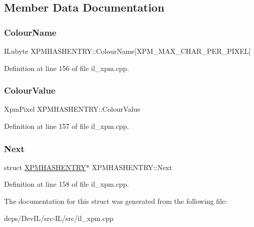 \subsection{Member Data Documentation}
\mbox{\label{structXPMHASHENTRY_a8a0e96a574a0b292cd5dfeefffe5e3a2}} 
\subsubsection{\texorpdfstring{Colour\+Name}{ColourName}}
{\footnotesize\ttfamily I\+Lubyte X\+P\+M\+H\+A\+S\+H\+E\+N\+T\+R\+Y\+::\+Colour\+Name\mbox{[}X\+P\+M\+\_\+\+M\+A\+X\+\_\+\+C\+H\+A\+R\+\_\+\+P\+E\+R\+\_\+\+P\+I\+X\+EL\mbox{]}}



Definition at line 156 of file il\+\_\+xpm.\+cpp.

\mbox{\label{structXPMHASHENTRY_a4dcb5591fd4048d549ead4dd0114590f}} 
\subsubsection{\texorpdfstring{Colour\+Value}{ColourValue}}
{\footnotesize\ttfamily Xpm\+Pixel X\+P\+M\+H\+A\+S\+H\+E\+N\+T\+R\+Y\+::\+Colour\+Value}



Definition at line 157 of file il\+\_\+xpm.\+cpp.

\mbox{\label{structXPMHASHENTRY_a165c0c800b7985e6427a119ac859ec8a}} 
\subsubsection{\texorpdfstring{Next}{Next}}
{\footnotesize\ttfamily struct \hyperlink{structXPMHASHENTRY}{X\+P\+M\+H\+A\+S\+H\+E\+N\+T\+RY}$\ast$ X\+P\+M\+H\+A\+S\+H\+E\+N\+T\+R\+Y\+::\+Next}



Definition at line 158 of file il\+\_\+xpm.\+cpp.



The documentation for this struct was generated from the following file\+:\begin{DoxyCompactItemize}
\item 
deps/\+Dev\+I\+L/src-\/\+I\+L/src/il\+\_\+xpm.\+cpp\end{DoxyCompactItemize}
